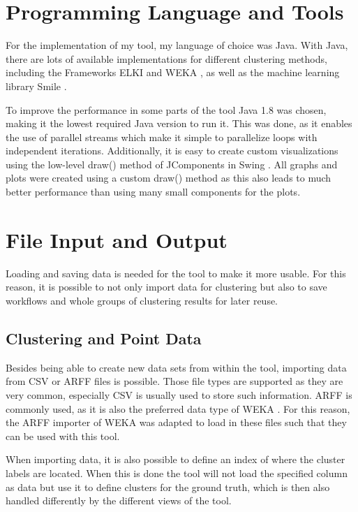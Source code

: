 \documentclass[
	a4paper,
	english,
	twoside,
	openright,               
	11pt                            
	]{report}
\begin{document}
\section{Programming Language and Tools}
For the implementation of my tool, my language of choice was Java. With Java, there are lots of available implementations for different clustering methods, including the Frameworks ELKI \cite{10.1007/978-3-540-69497-7_41} and WEKA \cite{10.1145/1656274.1656278}, as well as the machine learning library Smile \cite{javasmile}. 

To improve the performance in some parts of the tool Java 1.8 was chosen, making it the lowest required Java version to run it. This was done, as it enables the use of parallel streams which make it simple to parallelize loops with independent iterations. Additionally, it is easy to create custom visualizations using the low-level draw() method of JComponents in Swing \cite{javaswing}. All graphs and plots were created using a custom draw() method as this also leads to much better performance than using many small components for the plots.

\section{File Input and Output}
Loading and saving data is needed for the tool to make it more usable. For this reason, it is possible to not only import data for clustering but also to save workflows and whole groups of clustering results for later reuse.
\subsection{Clustering and Point Data}
Besides being able to create new data sets from within the tool, importing data from CSV or ARFF files is possible. Those file types are supported as they are very common, especially CSV is usually used to store such information. ARFF is commonly used, as it is also the preferred data type of WEKA \cite{10.1145/1656274.1656278}. For this reason, the ARFF importer of WEKA was adapted to load in these files such that they can be used with this tool. 

When importing data, it is also possible to define an index of where the cluster labels are located. When this is done the tool will not load the specified column as data but use it to define clusters for the ground truth, which is then also handled differently by the different views of the tool.
\end{document}
